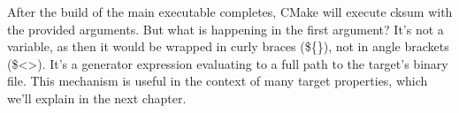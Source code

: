 

After the build of the main executable completes, CMake will execute cksum with the provided arguments. But what is happening in the first argument? It’s not a variable, as then it would be wrapped in curly braces (\$\{\}), not in angle brackets (\$<>). It’s a generator expression evaluating to a full path to the target’s binary file. This mechanism is useful in the context of many target properties, which we’ll explain in the next chapter.




























